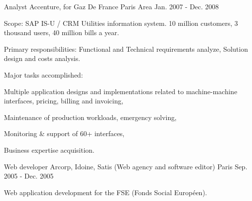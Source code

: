 \begin{cventries}
  \cventry
    {Analyst} %
    {Accenture, for Gaz De France} %
    {Paris Area} %
    {Jan. 2007 - Dec. 2008} %
    {
      \begin{cvitems} %
        \item {Scope: SAP IS-U / CRM Utilities information system. 10 million customers, 3 thousand users, 40 million bills a year.}
        \item {Primary responsibilities: Functional and Technical requirements analyze, Solution design and costs analysis.}
        \item {Major tasks accomplished:}
        \begin{cvsubitems}
          \item {Multiple application designs and implementations related to machine-machine interfaces, pricing, billing and invoicing,}
          \item {Maintenance of production workloads, emergency solving,}
          \item {Monitoring \& support of 60+ interfaces,}
          \item {Business expertise acquisition.}
        \end{cvsubitems}
      \end{cvitems}
    }

  \cventry
    {Web developer} %
    {Arcorp, Idoine, Satis (Web agency and software editor)} %
    {Paris} %
    {Sep. 2005 - Dec. 2005} %
    {
      \begin{cvitems} %
        \item {Web application development for the FSE (Fonds Social Européen).}
      \end{cvitems}
    }

\end{cventries}
